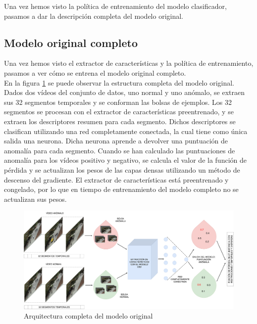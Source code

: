 \documentclass[../main.tex]{memoir}
\begin{document}
Una vez hemos visto la política de entrenamiento del modelo
clasificador, pasamos a dar la descripción completa del modelo
original.

\subsection{Modelo original completo}

Una vez hemos visto el extractor de características y la política de
entrenamiento, pasamos a ver cómo se entrena el modelo original
completo.\\

En la figura \ref{fig:original-model} se puede observar la estructura
completa del modelo original. Dados dos vídeos del conjunto de datos,
uno normal y uno anómalo, se extraen sus 32 segmentos temporales y se
conforman las bolsas de ejemplos. Los 32 segmentos se procesan con el
extractor de características preentrenado, y se extraen los
descriptores resumen para cada segmento. Dichos descriptores se
clasifican utilizando una red completamente conectada, la cual tiene
como única salida una neurona. Dicha neurona aprende a devolver una
puntuación de anomalía para cada segmento. Cuando se han calculado las
puntuaciones de anomalía para los vídeos positivo y negativo, se
calcula el valor de la función de pérdida y se actualizan los pesos de
las capas densas utilizando un método de descenso del gradiente. El
extractor de características está preentrenado y congelado, por lo que
en tiempo de entrenamiento del modelo completo no se actualizan sus
pesos.\\

\begin{figure}[hbtp]
  \centering
  \includegraphics[width=\textwidth]{images/original_model.pdf}
  \caption{Arquitectura completa del modelo original}
  \label{fig:original-model}
\end{figure}
\end{document}
